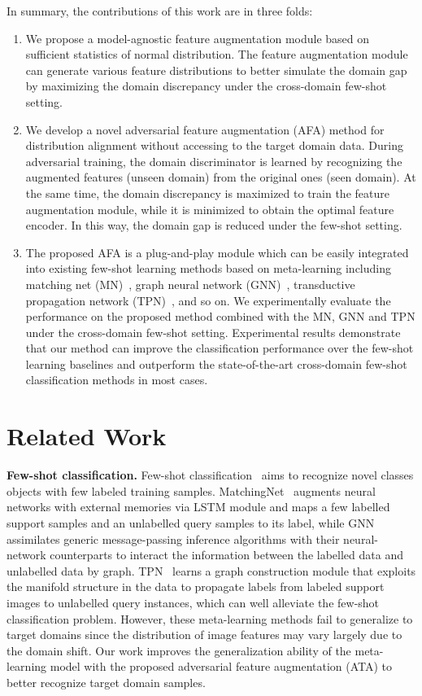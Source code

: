 \documentclass[runningheads]{utils/llncs}
\begin{document}
In summary, the contributions of this work are in three folds: 
\begin{enumerate}
\item We propose a model-agnostic feature augmentation module based on sufficient statistics of normal distribution.
The feature augmentation module can generate various feature distributions to better simulate the domain gap by maximizing the domain discrepancy under the cross-domain few-shot setting. 


\item We develop a novel adversarial feature augmentation (AFA) method for distribution alignment without accessing to the target domain data.
During adversarial training, the domain discriminator is learned by recognizing the augmented features (unseen domain) from the original ones (seen domain).
At the same time, the domain discrepancy is maximized to train the feature augmentation module, while it is minimized to obtain the optimal feature encoder.
In this way, the domain gap is reduced under the few-shot setting.


\item The proposed AFA is a plug-and-play module which can be easily integrated into existing few-shot learning methods based on meta-learning including matching net (MN)~\cite{NIPS2016_90e13578}, graph neural network (GNN)~\cite{SatorrasE18}, transductive propagation network (TPN)~\cite{LiuLPKYHY19}, and so on.
We experimentally evaluate the performance on the proposed method combined with the MN, GNN and TPN  under the cross-domain few-shot setting. 
Experimental results demonstrate that our method can improve the classification performance over the few-shot learning baselines and outperform the state-of-the-art cross-domain few-shot classification methods in most cases.
\end{enumerate} \section{Related Work}

{\bf Few-shot classification.}
Few-shot classification~\cite{FinnAL17,FrikhaKKT21,GuoCKCSSRF20,LiuCLL0LH20,LiuLPKYHY19,WuSLPZ20} aims to recognize novel classes objects with few labeled training samples. MatchingNet~\cite{NIPS2016_90e13578} augments neural networks with external memories via LSTM module and maps a few labelled support samples and an unlabelled query samples to its label, while GNN~\cite{SatorrasE18} assimilates generic message-passing inference algorithms with their neural-network counterparts to interact the information between the labelled data and unlabelled data by graph. 
TPN~\cite{LiuLPKYHY19} learns a graph construction module that exploits the manifold structure in the data to propagate labels from labeled support images to unlabelled query instances, which can well alleviate the few-shot classification problem.
However, these meta-learning methods fail to generalize to target domains since the distribution of image features may vary largely due to the domain shift. Our work improves the generalization ability of the meta-learning model with the proposed adversarial feature augmentation (ATA) to better recognize target domain samples. 
\end{document}
